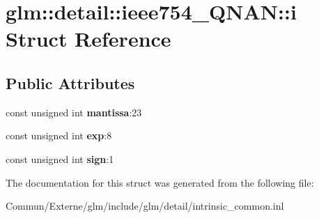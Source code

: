 \hypertarget{structglm_1_1detail_1_1ieee754___q_n_a_n_1_1i}{}\section{glm\+:\+:detail\+:\+:ieee754\+\_\+\+Q\+N\+AN\+:\+:i Struct Reference}
\label{structglm_1_1detail_1_1ieee754___q_n_a_n_1_1i}
\subsection*{Public Attributes}
\begin{DoxyCompactItemize}
\item 
const unsigned int {\bfseries mantissa}\+:23\hypertarget{structglm_1_1detail_1_1ieee754___q_n_a_n_1_1i_a1999926defcba631a716bee7d3044d0a}{}\label{structglm_1_1detail_1_1ieee754___q_n_a_n_1_1i_a1999926defcba631a716bee7d3044d0a}

\item 
const unsigned int {\bfseries exp}\+:8\hypertarget{structglm_1_1detail_1_1ieee754___q_n_a_n_1_1i_abc8cdb38ff3aa6a09214f7bfa32efac8}{}\label{structglm_1_1detail_1_1ieee754___q_n_a_n_1_1i_abc8cdb38ff3aa6a09214f7bfa32efac8}

\item 
const unsigned int {\bfseries sign}\+:1\hypertarget{structglm_1_1detail_1_1ieee754___q_n_a_n_1_1i_a5dd7e174864b6a8cd045563dde44f305}{}\label{structglm_1_1detail_1_1ieee754___q_n_a_n_1_1i_a5dd7e174864b6a8cd045563dde44f305}

\end{DoxyCompactItemize}


The documentation for this struct was generated from the following file\+:\begin{DoxyCompactItemize}
\item 
Commun/\+Externe/glm/include/glm/detail/intrinsic\+\_\+common.\+inl\end{DoxyCompactItemize}
